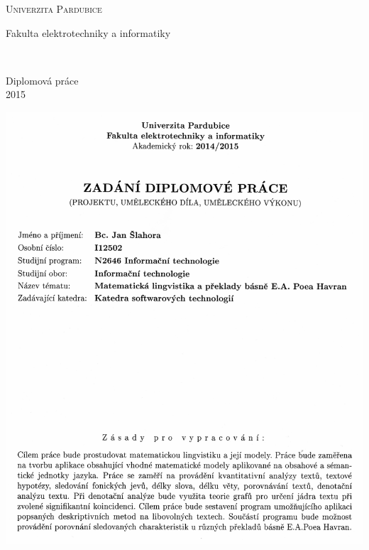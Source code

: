 \documentclass[11pt,a4paper,fleqn,titlepage,twoside,openany,export]{book}
\begin{document}
\makeatletter
\begin{titlepage}
	\begin{center}
	
	\textsc{\Huge{Univerzita Pardubice}}

	\LARGE{Fakulta elektrotechniky a informatiky}
	
	\vfill
	
	\huge{\@title}\\[2mm]
	\LARGE{\@author}
	
	\vfill

	\begin{normalsize}
	Diplomová práce\\
	2015
	\end{normalsize}
	\end{center}
\end{titlepage}


\newpage  
\thispagestyle{empty}
\begin{center}
\includegraphics[max width=\textwidth,keepaspectratio=true]{imgs-00-zadani/zadani_str_1.png}
\end{center}
\hspace{0pt}
\end{document}
